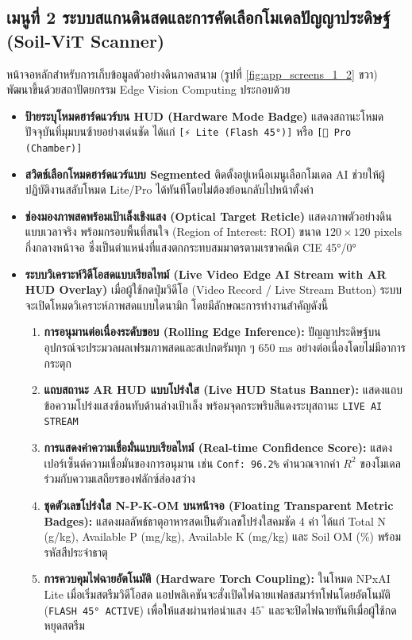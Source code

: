 \documentclass[12pt,a4paper,oneside]{book}
\begin{document}
\subsection{เมนูที่ 2 ระบบสแกนดินสดและการคัดเลือกโมเดลปัญญาประดิษฐ์ (Soil-ViT Scanner)}
หน้าจอหลักสำหรับการเก็บข้อมูลตัวอย่างดินภาคสนาม (รูปที่ \ref{fig:app_screens_1_2} ขวา) พัฒนาขึ้นด้วยสถาปัตยกรรม Edge Vision Computing ประกอบด้วย
\begin{itemize}
    \item \textbf{ป้ายระบุโหมดฮาร์ดแวร์บน HUD (Hardware Mode Badge)} แสดงสถานะโหมดปัจจุบันที่มุมบนซ้ายอย่างเด่นชัด ได้แก่ \texttt{[⚡ Lite (Flash 45°)]} หรือ \texttt{[🔬 Pro (Chamber)]}
    \item \textbf{สวิตช์เลือกโหมดฮาร์ดแวร์แบบ Segmented} ติดตั้งอยู่เหนือเมนูเลือกโมเดล AI ช่วยให้ผู้ปฏิบัติงานสลับโหมด Lite/Pro ได้ทันทีโดยไม่ต้องย้อนกลับไปหน้าตั้งค่า
    \item \textbf{ช่องมองภาพสดพร้อมเป้าเล็งเชิงแสง (Optical Target Reticle)} แสดงภาพตัวอย่างดินแบบเวลาจริง พร้อมกรอบพื้นที่สนใจ (Region of Interest: ROI) ขนาด $120 \times 120\text{ pixels}$ กึ่งกลางหน้าจอ ซึ่งเป็นตำแหน่งที่แสงตกกระทบสมมาตรตามเรขาคณิต CIE 45°/0°
    \item \textbf{ระบบวิเคราะห์วิดีโอสดแบบเรียลไทม์ (Live Video Edge AI Stream with AR HUD Overlay)}
    เมื่อผู้ใช้กดปุ่มวิดีโอ (Video Record / Live Stream Button) ระบบจะเปิดโหมดวิเคราะห์ภาพสดแบบไดนามิก โดยมีลักษณะการทำงานสำคัญดังนี้
    \begin{enumerate}
        \item \textbf{การอนุมานต่อเนื่องระดับขอบ (Rolling Edge Inference):} ปัญญาประดิษฐ์บนอุปกรณ์จะประมวลผลเฟรมภาพสดและสเปกตรัมทุก ๆ $650\text{ ms}$ อย่างต่อเนื่องโดยไม่มีอาการกระตุก
        \item \textbf{แถบสถานะ AR HUD แบบโปร่งใส (Live HUD Status Banner):} แสดงแถบข้อความโปร่งแสงซ้อนทับด้านล่างเป้าเล็ง พร้อมจุดกระพริบสีแดงระบุสถานะ \texttt{LIVE AI STREAM}
        \item \textbf{การแสดงค่าความเชื่อมั่นแบบเรียลไทม์ (Real-time Confidence Score):} แสดงเปอร์เซ็นต์ความเชื่อมั่นของการอนุมาน เช่น \texttt{Conf: 96.2\%} คำนวณจากค่า $R^2$ ของโมเดลร่วมกับความเสถียรของฟลักซ์ส่องสว่าง
        \item \textbf{ชุดตัวเลขโปร่งใส N-P-K-OM บนหน้าจอ (Floating Transparent Metric Badges):} แสดงผลลัพธ์ธาตุอาหารสดเป็นตัวเลขโปร่งใสคมชัด 4 ค่า ได้แก่ Total N (g/kg), Available P (mg/kg), Available K (mg/kg) และ Soil OM (\%) พร้อมรหัสสีประจำธาตุ
        \item \textbf{การควบคุมไฟฉายอัตโนมัติ (Hardware Torch Coupling):} ในโหมด NPxAI Lite เมื่อเริ่มสตรีมวิดีโอสด แอปพลิเคชันจะสั่งเปิดไฟฉายแฟลชสมาร์ทโฟนโดยอัตโนมัติ (\texttt{FLASH 45° ACTIVE}) เพื่อให้แสงผ่านท่อนำแสง $45^\circ$ และจะปิดไฟฉายทันทีเมื่อผู้ใช้กดหยุดสตรีม

\end{enumerate}
\end{itemize}
\end{document}
